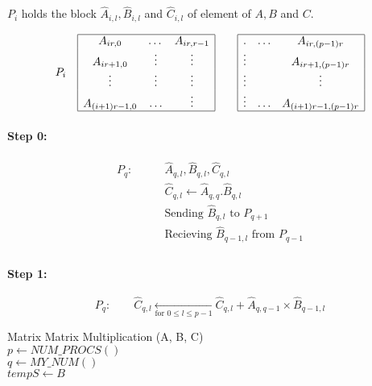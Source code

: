 $P_i$ holds the block $\hat{A}_{i,l}, \hat{B}_{i,l}$ and $\hat{C}_{i,l}$ of element of $A, B$ and $C$.

\[
P_i \quad
\begin{array}{|c c c|}
\hline
A_{ir,0} & \dots & A_{ir,r-1}\\
A_{ir+1,0} & \vdots & \vdots\\
\vdots & \vdots & \vdots\\
A_{(i+1)r-1,0} & \hdots & \vdots\\
\hline
\end{array}
\qquad
\begin{array}{|c c c|}
\hline
. &\hdots&A_{ir,(p-1)r}\\
\vdots& & A_{ir+1,(p-1)r}\\
\vdots& & \vdots\\
\vdots&\hdots& A_{(i+1)r-1,(p-1)r}\\
\hline
\end{array}
\]

\paragraph{Step 0:}
\begin{align*}
P_q: \qquad& \hat{A}_{q,l},\hat{B}_{q,l}, \hat{C}_{q,l}\\
& \hat{C}_{q,l}\leftarrow \hat{A}_{q,q}.\hat{B}_{q,l}\\
& \text{Sending } \hat{B}_{q,l} \text{ to } P_{q+1}\\
& \text{Recieving } \hat{B}_{q-1,l} \text{ from } P_{q-1}\\
\end{align*}

\paragraph{Step 1:}
\[
P_q: \qquad \hat{C}_{q,l} \underset{\text{for } 0\leq l \leq p-1}{\leftarrow} \hat{C}_{q,l}+\hat{A}_{q,q-1}\times \hat{B}_{q-1,l}
\]


\begin{algorithm}
Matrix Matrix Multiplication (A, B, C)\\
$p\leftarrow NUM\_PROCS()$\\
$q\leftarrow MY\_NUM()$\\
$tempS\leftarrow B$\\
\end{algorithm}

